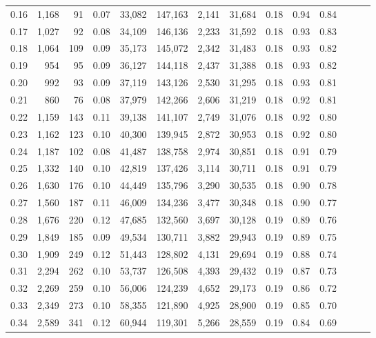 \begin{tabular}{rrrrrrrrrrrrrr}
0.16 &  1,168 &   91 &  0.07 &   33,082 &  147,163 &   2,141 &  31,684 &  0.18 &  0.94 &      0.84 \\
0.17 &  1,027 &   92 &  0.08 &   34,109 &  146,136 &   2,233 &  31,592 &  0.18 &  0.93 &      0.83 \\
0.18 &  1,064 &  109 &  0.09 &   35,173 &  145,072 &   2,342 &  31,483 &  0.18 &  0.93 &      0.82 \\
0.19 &    954 &   95 &  0.09 &   36,127 &  144,118 &   2,437 &  31,388 &  0.18 &  0.93 &      0.82 \\
0.20 &    992 &   93 &  0.09 &   37,119 &  143,126 &   2,530 &  31,295 &  0.18 &  0.93 &      0.81 \\
0.21 &    860 &   76 &  0.08 &   37,979 &  142,266 &   2,606 &  31,219 &  0.18 &  0.92 &      0.81 \\
0.22 &  1,159 &  143 &  0.11 &   39,138 &  141,107 &   2,749 &  31,076 &  0.18 &  0.92 &      0.80 \\
0.23 &  1,162 &  123 &  0.10 &   40,300 &  139,945 &   2,872 &  30,953 &  0.18 &  0.92 &      0.80 \\
0.24 &  1,187 &  102 &  0.08 &   41,487 &  138,758 &   2,974 &  30,851 &  0.18 &  0.91 &      0.79 \\
0.25 &  1,332 &  140 &  0.10 &   42,819 &  137,426 &   3,114 &  30,711 &  0.18 &  0.91 &      0.79 \\
0.26 &  1,630 &  176 &  0.10 &   44,449 &  135,796 &   3,290 &  30,535 &  0.18 &  0.90 &      0.78 \\
0.27 &  1,560 &  187 &  0.11 &   46,009 &  134,236 &   3,477 &  30,348 &  0.18 &  0.90 &      0.77 \\
0.28 &  1,676 &  220 &  0.12 &   47,685 &  132,560 &   3,697 &  30,128 &  0.19 &  0.89 &      0.76 \\
0.29 &  1,849 &  185 &  0.09 &   49,534 &  130,711 &   3,882 &  29,943 &  0.19 &  0.89 &      0.75 \\
0.30 &  1,909 &  249 &  0.12 &   51,443 &  128,802 &   4,131 &  29,694 &  0.19 &  0.88 &      0.74 \\
0.31 &  2,294 &  262 &  0.10 &   53,737 &  126,508 &   4,393 &  29,432 &  0.19 &  0.87 &      0.73 \\
0.32 &  2,269 &  259 &  0.10 &   56,006 &  124,239 &   4,652 &  29,173 &  0.19 &  0.86 &      0.72 \\
0.33 &  2,349 &  273 &  0.10 &   58,355 &  121,890 &   4,925 &  28,900 &  0.19 &  0.85 &      0.70 \\
0.34 &  2,589 &  341 &  0.12 &   60,944 &  119,301 &   5,266 &  28,559 &  0.19 &  0.84 &      0.69 \\

\end{tabular}
